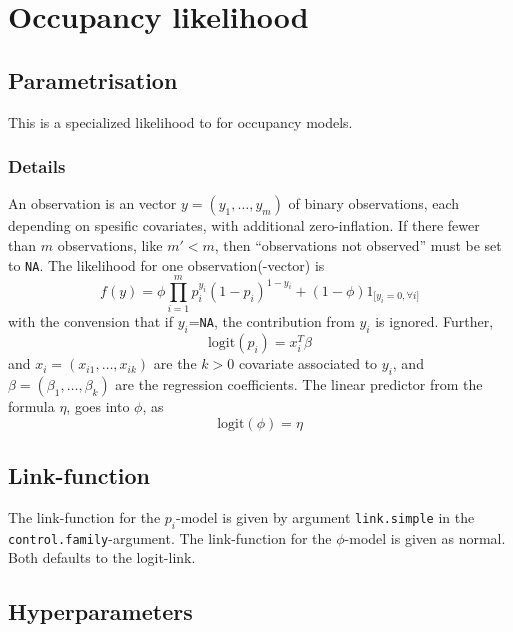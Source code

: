 \documentclass[a4paper,11pt]{article}
\begin{document}
\section*{Occupancy likelihood}

\subsection*{Parametrisation}

This is a specialized likelihood to for occupancy models.

\subsubsection*{Details}

An observation is an vector $y=(y_1, \ldots, y_m)$ of binary
observations, each depending on spesific covariates, with additional
zero-inflation. If there fewer than $m$ observations, like $m' < m$,
then ``observations not observed'' must  be set to \texttt{NA}.
The likelihood for one observation(-vector) is
\begin{displaymath}
    f(y) = \phi \prod_{i=1}^{m} p_i^{y_i} (1-p_i)^{1-y_i} + (1-\phi)
    1_{\text{[$y_i=0, \forall i$]}}
\end{displaymath}
with the convension that if $y_i$=\texttt{NA}, the contribution from
$y_i$ is ignored.
Further,
\begin{displaymath}
    \text{logit}(p_i) = x_i^{T} \beta
\end{displaymath}
and $x_i= (x_{i1}, \ldots, x_{ik})$ are the $k>0$ covariate associated
to $y_i$, and $\beta=(\beta_1, \ldots, \beta_k)$ are the regression
coefficients. The linear predictor from the formula $\eta$, goes into
$\phi$, as
\begin{displaymath}
    \text{logit}(\phi) = \eta
\end{displaymath}

\subsection*{Link-function}

The link-function for the $p_i$-model is given by argument
\texttt{link.simple} in the \texttt{control.family}-argument. The
link-function for the $\phi$-model is given as normal. Both defaults
to the logit-link.

\subsection*{Hyperparameters}
\end{document}
